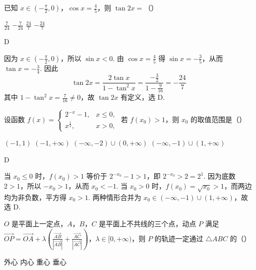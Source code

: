 \begin{problem}
已知 \(x \in \left(-\frac{\pi}{2}, 0\right)\)，\(\cos x = \frac{4}{5}\)，则 \(\tan 2x =\)（\quad）

\choices
    {\( \frac{7}{24} \)}
    {\( -\frac{7}{24} \)}
    {\( \frac{24}{7} \)}
    {\( -\frac{24}{7} \)}
\end{problem}

\begin{answer}
D
\end{answer}

\begin{solution}
因为 \(x\in\left(-\frac{\pi}{2},0\right)\)，所以 \(\sin x<0\). 由 \(\cos x=\frac45\) 得 \(\sin x=-\frac35\)，从而 \(\tan x=-\frac34\). 因此
\[
\tan 2x=\frac{2\tan x}{1-\tan^{2}x}=\frac{-\frac32}{1-\frac{9}{16}}=-\frac{24}{7}
\]
其中 \(1-\tan^{2}x=\frac7{16}\ne0\)，故 \(\tan 2x\) 有定义，选 D.
\end{solution}

\begin{problem}
设函数 \( f(x) = \begin{cases}
2^{-x} - 1, & x \leqslant 0,\\
x^{\frac{1}{2}}, & x > 0,
\end{cases} \) 若 \( f(x_0) > 1 \)，则 \( x_0 \) 的取值范围是（\quad）

\choices
    {\((-1, 1)\)}
    {\( (-1,+\infty) \)}
    {\((- \infty, -2) \cup (0, +\infty)\)}
    {\((-\infty, -1) \cup (1, +\infty)\)}
\end{problem}

\begin{answer}
D
\end{answer}

\begin{solution}
当 \(x_{0}\leqslant0\) 时，\(f(x_{0})>1\) 等价于 \(2^{-x_{0}}-1>1\)，即 \(2^{-x_{0}}>2=2^{1}\). 因为底数 \(2>1\)，所以 \(-x_{0}>1\)，从而 \(x_{0}<-1\). 当 \(x_{0}>0\) 时，\(f(x_{0})=\sqrt{x_{0}}>1\)，而两边均为非负数，平方得 \(x_{0}>1\). 两种情形合并为 \(x_{0}\in(-\infty,-1)\cup(1,+\infty)\)，故选 D.
\end{solution}

\begin{problem}
\(O\) 是平面上一定点，\(A\)，\(B\)，\(C\) 是平面上不共线的三个点，动点 \(P\) 满足 \(\overrightarrow{OP} = \overrightarrow{OA} + \lambda \left(\frac{\overrightarrow{AB}}{|\overrightarrow{AB}|} + \frac{\overrightarrow{AC}}{|\overrightarrow{AC}|}\right)\)，\(\lambda \in [0, +\infty)\)，则 \(P\) 的轨迹一定通过 \(\triangle ABC\) 的（\quad）

\choices
    {外心}
    {内心}
    {重心}
    {垂心}
\end{problem}

